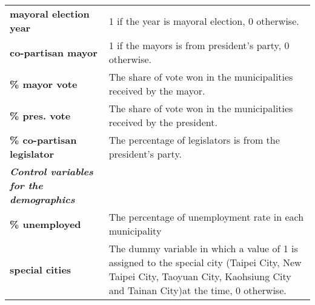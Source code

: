 \begin{table}[!htbp]
\begin{center}
{\begin{tabular} {@{\extracolsep{1pt}} p{6cm} p{13cm}}
\textbf{mayoral election year} & 1 if the year is mayoral election, 0 otherwise.\\ [1ex]  
\textbf{co-partisan mayor} & 1 if the mayors is from president's party, 0 otherwise. \\[1ex]  
\textbf{\% mayor vote} & The share of vote won in the municipalities received by the mayor.\\ [1ex] 
\textbf{\% pres. vote}  & The share of vote won in the municipalities received by the president.\\[1ex] 
\textbf{\% co-partisan  legislator}  &  The percentage of legislators is from the  president's party.\\[1ex]
\midrule 
\textbf{\textit{Control variables for the demographics}}\\
\textbf{\% unemployed} &  The percentage of unemployment rate in each municipality\\[1ex] 
\textbf{special cities} & The dummy variable in which a value of 1 is assigned to the special city (Taipei City, New Taipei City, Taoyuan City, Kaohsiung City and Tainan City)at the time, 0 otherwise. \\ 
    \bottomrule
    \end{tabular}} 
    \end{center}
\end{table} 
